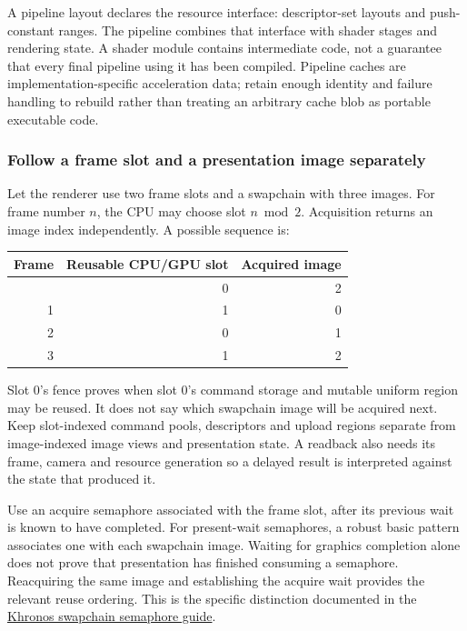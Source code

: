 A pipeline layout declares the resource interface: descriptor-set layouts and push-constant ranges. The pipeline combines that interface with shader stages and rendering state. A shader module contains intermediate code, not a guarantee that every final pipeline using it has been compiled. Pipeline caches are implementation-specific acceleration data; retain enough identity and failure handling to rebuild rather than treating an arbitrary cache blob as portable executable code.

\subsubsection{Follow a frame slot and a presentation image separately}\label{follow-a-frame-slot-and-a-presentation-image-separately}

Let the renderer use two frame slots and a swapchain with three images. For frame number \(n\), the CPU may choose slot \(n\bmod2\). Acquisition returns an image index independently. A possible sequence is:

{\def\LTcaptype{none} %
\begin{longtable}[]{@{}rrr@{}}
\toprule\noalign{}
Frame & Reusable CPU/GPU slot & Acquired image \\
\midrule\noalign{}
\endhead
\bottomrule\noalign{}
\endlastfoot
0 & 0 & 2 \\
1 & 1 & 0 \\
2 & 0 & 1 \\
3 & 1 & 2 \\
\end{longtable}
}

Slot 0's fence proves when slot 0's command storage and mutable uniform region may be reused. It does not say which swapchain image will be acquired next. Keep slot-indexed command pools, descriptors and upload regions separate from image-indexed image views and presentation state. A readback also needs its frame, camera and resource generation so a delayed result is interpreted against the state that produced it.

Use an acquire semaphore associated with the frame slot, after its previous wait is known to have completed. For present-wait semaphores, a robust basic pattern associates one with each swapchain image. Waiting for graphics completion alone does not prove that presentation has finished consuming a semaphore. Reacquiring the same image and establishing the acquire wait provides the relevant reuse ordering. This is the specific distinction documented in the \href{https://docs.vulkan.org/guide/latest/swapchain_semaphore_reuse.html}{Khronos swapchain semaphore guide}.

